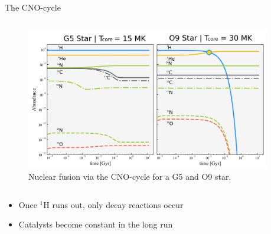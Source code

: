 \begin{frame}{The CNO-cycle}
\begin{columns}
    \begin{column}{0.8\textwidth}
    \begin{figure}
        \centering
        \includegraphics[width = 1\textwidth]{figs/cno2.pdf}
        \caption{Nuclear fusion via the CNO-cycle for a G5 and O9 star.}
        \label{fig:enter-label}
    \end{figure}

    \end{column}
    \begin{column}{0.2\textwidth}
    \end{column}
\end{columns}
    \begin{itemize}
        \item<4->Once ${}^\text{1}$H runs out, only decay reactions occur
        \item<5->Catalysts become constant in the long run
    \end{itemize}
\end{frame}

